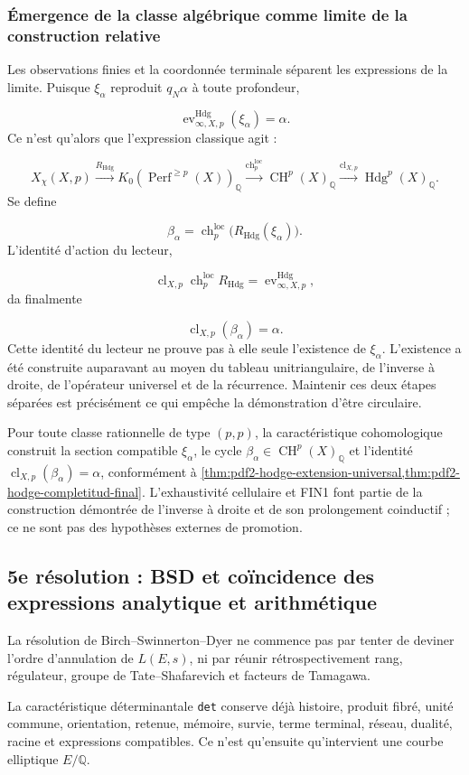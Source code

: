 \subsubsection{Émergence de la classe algébrique comme limite de la construction relative}
Les observations finies et la coordonnée terminale séparent les expressions de la limite. Puisque \(\xi_\alpha\) reproduit \(q_N\alpha\) à toute profondeur,\par
\[
\operatorname{ev}_{\infty,X,p}^{\mathrm{Hdg}}
(\xi_\alpha)
=
\alpha.
\]
Ce n’est qu’alors que l’expression classique agit :\par
\[
X_\chi(X,p)
\xrightarrow{R_{\mathrm{Hdg}}}
K_0\!\left(
\operatorname{Perf}^{\ge p}(X)
\right)_{\mathbb Q}
\xrightarrow{\operatorname{ch}^{\mathrm{loc}}_p}
\operatorname{CH}^{p}(X)_{\mathbb Q}
\xrightarrow{\operatorname{cl}_{X,p}}
\operatorname{Hdg}^{p}(X)_{\mathbb Q}.
\]
Se define\par
\[
\beta_\alpha
=
\operatorname{ch}^{\mathrm{loc}}_p
\bigl(R_{\mathrm{Hdg}}(\xi_\alpha)\bigr).
\]
L’identité d’action du lecteur,\par
\[
\operatorname{cl}_{X,p}
\operatorname{ch}^{\mathrm{loc}}_p
R_{\mathrm{Hdg}}
=
\operatorname{ev}_{\infty,X,p}^{\mathrm{Hdg}},
\]
da finalmente\par
\[
\operatorname{cl}_{X,p}(\beta_\alpha)
=
\alpha.
\]
Cette identité du lecteur ne prouve pas à elle seule l’existence de \(\xi_\alpha\). L’existence a été construite auparavant au moyen du tableau unitriangulaire, de l’inverse à droite, de l’opérateur universel et de la récurrence. Maintenir ces deux étapes séparées est précisément ce qui empêche la démonstration d’être circulaire.\par
Pour toute classe rationnelle de type \((p,p)\), la caractéristique cohomologique construit la section compatible \(\xi_\alpha\), le cycle \(\beta_\alpha\in\operatorname{CH}^p(X)_{\mathbb Q}\) et l’identité \(\operatorname{cl}_{X,p}(\beta_\alpha)=\alpha\), conformément à \cref{thm:pdf2-hodge-extension-universal,thm:pdf2-hodge-completitud-final}. L’exhaustivité cellulaire et FIN1 font partie de la construction démontrée de l’inverse à droite et de son prolongement coinductif ; ce ne sont pas des hypothèses externes de promotion.\par
{}
\subsection{5e résolution : BSD et coïncidence des expressions analytique et arithmétique}
La résolution de Birch–Swinnerton–Dyer ne commence pas par tenter de deviner l’ordre d’annulation de \(L(E,s)\), ni par réunir rétrospectivement rang, régulateur, groupe de Tate–Shafarevich et facteurs de Tamagawa.\par
La caractéristique déterminantale \texttt{det} conserve déjà histoire, produit fibré, unité commune, orientation, retenue, mémoire, survie, terme terminal, réseau, dualité, racine et expressions compatibles. Ce n’est qu’ensuite qu’intervient une courbe elliptique \(E/\mathbb Q\).\par
{}
